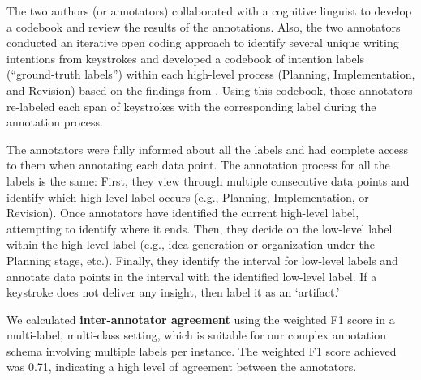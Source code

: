 The two authors (or annotators) collaborated with a cognitive linguist to develop a codebook and review the results of the annotations. Also, the two annotators conducted an iterative open coding approach to identify several unique writing intentions from keystrokes and developed a codebook of intention labels (“ground-truth labels”) within each high-level process (Planning, Implementation, and Revision) based on the findings from \citet{f508427a-e4c0-3d6a-8abf-03a5d21ec6c4, koo2023decoding}. Using this codebook, those annotators re-labeled each span of keystrokes with the corresponding label during the annotation process. 

The annotators were fully informed about all the labels and had complete access to them when annotating each data point. The annotation process for all the labels is the same: First, they view through multiple consecutive data points and identify which high-level label occurs (e.g., Planning, Implementation, or Revision). Once annotators have identified the current high-level label, attempting to identify where it ends. Then, they decide on the low-level label within the high-level label (e.g., idea generation or organization under the Planning stage, etc.). Finally, they identify the interval for low-level labels and annotate data points in the interval with the identified low-level label. If a keystroke does not deliver any insight, then label it as an `artifact.' 

We calculated \textbf{inter-annotator agreement} using the weighted F1 score in a multi-label, multi-class setting, which is suitable for our complex annotation schema involving multiple labels per instance. The weighted F1 score achieved was 0.71, indicating a high level of agreement between the annotators. 








